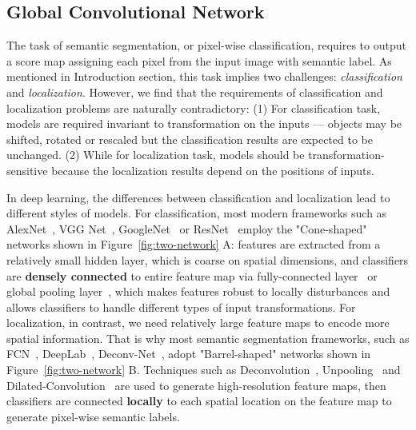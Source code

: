 \documentclass[10pt,twocolumn,letterpaper]{article}
\begin{document}
\subsection{Global Convolutional Network}
\label{sec:gcn}
   The task of semantic segmentation, or pixel-wise classification, requires to output a score map assigning each pixel from the input image with semantic label. As mentioned in Introduction section, this task implies two challenges: \emph{classification} and \emph{localization}. However, we find that the requirements of classification and localization problems are naturally contradictory: (1) For classification task, models are required invariant to transformation on the inputs --- objects may be shifted, rotated or rescaled but the classification results are expected to be unchanged. (2) While for localization task, models should be transformation-sensitive because the localization results depend on the positions of inputs.
\par
   In deep learning, the differences between classification and localization lead to different styles of models. For classification, most modern frameworks such as AlexNet~\cite{krizhevsky2012imagenet}, VGG Net~\cite{simonyan2014very}, GoogleNet~\cite{szegedy2015going,szegedy2015rethinking} or ResNet~\cite{He_2016_CVPR} employ the "Cone-shaped" networks shown in Figure~\ref{fig:two-network} A: features are extracted from a relatively small hidden layer, which is coarse on spatial dimensions, and classifiers are \textbf{densely connected} to entire feature map via fully-connected layer~\cite{krizhevsky2012imagenet,simonyan2014very} or global pooling layer~\cite{szegedy2015going,szegedy2015rethinking,He_2016_CVPR}, which makes features robust to locally disturbances and allows classifiers to handle different types of input transformations. For localization, in contrast, we need relatively large feature maps to encode more spatial information. That is why most semantic segmentation frameworks, such as FCN~\cite{long2015fully,shelhamer2016fully}, DeepLab~\cite{chen14semantic,chen2016deeplab}, Deconv-Net~\cite{noh2015learning}, adopt "Barrel-shaped" networks shown in Figure~\ref{fig:two-network} B. Techniques such as Deconvolution~\cite{long2015fully}, Unpooling~\cite{noh2015learning,badrinarayanan2015segnet} and Dilated-Convolution~\cite{chen14semantic,yu2015multi} are used to generate high-resolution feature maps, then classifiers are connected \textbf{locally} to each spatial location on the feature map to generate pixel-wise semantic labels.
\par
\end{document}
